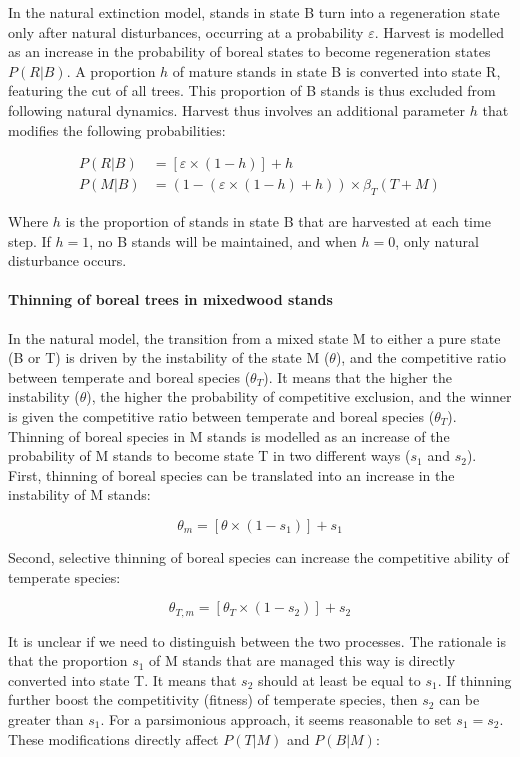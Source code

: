 In the natural extinction model, stands in state B turn into a
regeneration state only after natural disturbances, occurring at a
probability \(\varepsilon\). Harvest is modelled as an increase in the
probability of boreal states to become regeneration states \(P(R|B)\). A
proportion \(h\) of mature stands in state B is converted into state R,
featuring the cut of all trees. This proportion of B stands is thus
excluded from following natural dynamics. Harvest thus involves an
additional parameter \(h\) that modifies the following probabilities:

\[
\begin{aligned}
  P(R|B) &= [\varepsilon \times (1 - h)] + h \\
  P(M|B) &= (1- (\varepsilon \times (1 - h) + h)) \times \beta_T(T + M)
\end{aligned}
\]

Where \(h\) is the proportion of stands in state B that are harvested at
each time step. If \(h=1\), no B stands will be maintained, and when
\(h=0\), only natural disturbance occurs.

\hypertarget{thinning-of-boreal-trees-in-mixedwood-stands}{%
\paragraph{Thinning of boreal trees in mixedwood
stands}\label{thinning-of-boreal-trees-in-mixedwood-stands}}

In the natural model, the transition from a mixed state M to either a
pure state (B or T) is driven by the instability of the state M
(\(\theta\)), and the competitive ratio between temperate and boreal
species (\(\theta_T\)). It means that the higher the instability
(\(\theta\)), the higher the probability of competitive exclusion, and
the winner is given the competitive ratio between temperate and boreal
species (\(\theta_T\)). Thinning of boreal species in M stands is
modelled as an increase of the probability of M stands to become state T
in two different ways (\(s_1\) and \(s_2\)). First, thinning of boreal
species can be translated into an increase in the instability of M
stands:

\[
  \theta_{m} = [\theta \times (1 - s_1)] + s_1
\]

Second, selective thinning of boreal species can increase the
competitive ability of temperate species:

\[
\theta_{T, m} = [\theta_{T} \times (1 - s_2)] + s_2
\]

It is unclear if we need to distinguish between the two processes. The
rationale is that the proportion \(s_1\) of M stands that are managed
this way is directly converted into state T. It means that \(s_2\)
should at least be equal to \(s_1\). If thinning further boost the
competitivity (fitness) of temperate species, then \(s_2\) can be
greater than \(s_1\). For a parsimonious approach, it seems reasonable
to set \(s_1=s_2\). These modifications directly affect \(P(T|M)\) and
\(P(B|M)\):

